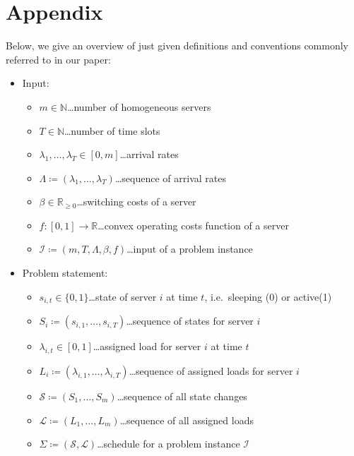 \documentclass[hidelinks]{article}
\theoremstyle{plain}
\theoremstyle{definition}
\theoremstyle{rem}
\newcommand{\inp}{\mathcal{I}}
\begin{document}
\newpage


\newpage

\section*{Appendix}
Below, we give an overview of just given definitions and conventions commonly referred to in our paper:
\begin{itemize}
\item Input:
\begin{itemize}
	\item $m\in\mathbb{N}$\ldots number of homogeneous servers
	\item $T\in\mathbb{N}$\ldots number of time slots
	\item $\lambda_1,\ldots,\lambda_{T}\in[0,m]$\ldots arrival rates
	\item $\Lambda\coloneqq(\lambda_1,\ldots,\lambda_T)$\ldots sequence of arrival rates
	\item $\beta\in\mathbb{R}_{\ge 0}$\ldots switching costs of a server
	\item $f:[0,1]\rightarrow\mathbb{R}$\ldots convex operating costs function of a server
	\item $\inp\coloneqq(m,T,\Lambda,\beta,f)$\ldots input of a problem instance
\end{itemize}

\item Problem statement:
\begin{itemize}
	\item $s_{i,t}\in\{0,1\}$\ldots state of server $i$ at time $t$, i.e.\ sleeping (0) or active(1)
	\item $S_i\coloneqq(s_{i,1},\ldots,s_{i,T})$\ldots sequence of states for server $i$
	\item $\lambda_{i,t}\in[0,1]$\ldots assigned load for server $i$ at time $t$
	\item $L_i\coloneqq(\lambda_{i,1},\ldots,\lambda_{i,T})$\ldots sequence of assigned loads for server $i$
	\item $\mathcal{S}\coloneqq(S_1,\ldots,S_m)$\ldots sequence of all state changes
	\item $\mathcal{L}\coloneqq(L_1,\ldots,L_m)$\ldots sequence of all assigned loads
	\item $\Sigma\coloneqq(\mathcal{S},\mathcal{L})$\ldots schedule for a problem instance $\inp$
\end{itemize}


\end{itemize}
\end{document}
